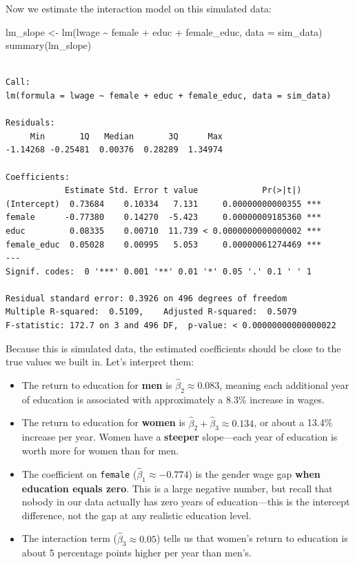 \documentclass[
  letterpaper,
  DIV=11,
  numbers=noendperiod]{scrreprt}
\newenvironment{Shaded}{\begin{snugshade}}{\end{snugshade}}
\newcommand{\AttributeTok}[1]{\textcolor[rgb]{0.40,0.45,0.13}{#1}}
\newcommand{\FunctionTok}[1]{\textcolor[rgb]{0.28,0.35,0.67}{#1}}
\newcommand{\NormalTok}[1]{\textcolor[rgb]{0.00,0.23,0.31}{#1}}
\newcommand{\OtherTok}[1]{\textcolor[rgb]{0.00,0.23,0.31}{#1}}
\newcommand{\SpecialCharTok}[1]{\textcolor[rgb]{0.37,0.37,0.37}{#1}}
\providecommand{\tightlist}{%
  \setlength{\itemsep}{0pt}\setlength{\parskip}{0pt}}
\begin{document}
Now we estimate the interaction model on this simulated data:

\begin{Shaded}
\begin{Highlighting}[]
\NormalTok{lm\_slope }\OtherTok{\textless{}{-}} \FunctionTok{lm}\NormalTok{(lwage }\SpecialCharTok{\textasciitilde{}}\NormalTok{ female }\SpecialCharTok{+}\NormalTok{ educ }\SpecialCharTok{+}\NormalTok{ female\_educ, }\AttributeTok{data =}\NormalTok{ sim\_data)}
\FunctionTok{summary}\NormalTok{(lm\_slope)}
\end{Highlighting}
\end{Shaded}

\begin{verbatim}

Call:
lm(formula = lwage ~ female + educ + female_educ, data = sim_data)

Residuals:
     Min       1Q   Median       3Q      Max 
-1.14268 -0.25481  0.00376  0.28289  1.34974 

Coefficients:
            Estimate Std. Error t value             Pr(>|t|)    
(Intercept)  0.73684    0.10334   7.131     0.00000000000355 ***
female      -0.77380    0.14270  -5.423     0.00000009185360 ***
educ         0.08335    0.00710  11.739 < 0.0000000000000002 ***
female_educ  0.05028    0.00995   5.053     0.00000061274469 ***
---
Signif. codes:  0 '***' 0.001 '**' 0.01 '*' 0.05 '.' 0.1 ' ' 1

Residual standard error: 0.3926 on 496 degrees of freedom
Multiple R-squared:  0.5109,    Adjusted R-squared:  0.5079 
F-statistic: 172.7 on 3 and 496 DF,  p-value: < 0.00000000000000022
\end{verbatim}

Because this is simulated data, the estimated coefficients should be
close to the true values we built in. Let's interpret them:

\begin{itemize}
\tightlist
\item
  The return to education for \textbf{men} is
  \(\hat{\beta}_2 \approx 0.083\), meaning each additional year of
  education is associated with approximately a 8.3\% increase in wages.
\item
  The return to education for \textbf{women} is
  \(\hat{\beta}_2 + \hat{\beta}_3 \approx 0.134\), or about a 13.4\%
  increase per year. Women have a \textbf{steeper} slope---each year of
  education is worth more for women than for men.
\item
  The coefficient on \texttt{female} (\(\hat{\beta}_1 \approx -0.774\))
  is the gender wage gap \textbf{when education equals zero}. This is a
  large negative number, but recall that nobody in our data actually has
  zero years of education---this is the intercept difference, not the
  gap at any realistic education level.
\item
  The interaction term (\(\hat{\beta}_3 \approx 0.05\)) tells us that
  women's return to education is about 5 percentage points higher per
  year than men's.
\end{itemize}
\end{document}
